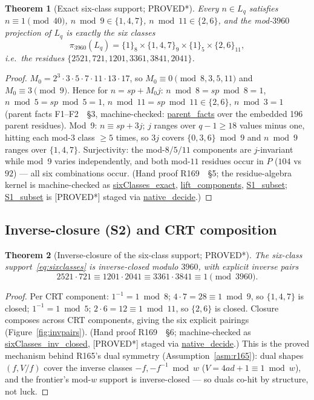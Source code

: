 \documentclass[11pt,a4paper]{article}
\newtheorem{theorem}{Theorem}
\theoremstyle{definition}
\begin{document}
\begin{theorem}[Exact six-class support; PROVED*]
  \label{thm:s1}
  Every $n\in L_q$ satisfies $n\equiv1\pmod{40}$, $n\bmod9\in\{1,4,7\}$,
  $n\bmod11\in\{2,6\}$, and the mod-$3960$ projection of $L_q$ is
  \emph{exactly} the six classes
  \begin{equation}
    \label{eq:sixclasses}
    \pi_{3960}(L_q)=\{1\}_8\times\{1,4,7\}_9\times\{1\}_5\times\{2,6\}_{11},
  \end{equation}
  i.e.\ the residues
  $\{2521,721,1201,3361,3841,2041\}$.
\end{theorem}
\begin{proof}
$M_0=2^3\cdot3\cdot5\cdot7\cdot11\cdot13\cdot17$, so
$M_0\equiv0\pmod{8,3,5,11}$ and $M_0\equiv3\pmod9$. Hence for
$n=sp+M_0j$: $n\bmod8=sp\bmod8=1$,
$n\bmod5=sp\bmod5=1$, $n\bmod11=sp\bmod11\in\{2,6\}$,
$n\bmod3=1$ (parent facts F1--F2~\cite{R169}~\S3, machine-checked:
\url{parent_facts} over the embedded 196 parent residues).
Mod~9: $n\equiv sp+3j$; $j$ ranges over $q-1\ge18$ values minus one,
hitting each mod-$3$ class $\ge5$ times, so $3j$ covers $\{0,3,6\}\bmod9$
and $n\bmod9$ ranges over $\{1,4,7\}$. Surjectivity: the
mod-$8/5/11$ components are $j$-invariant while mod~9 varies
independently, and both mod-$11$ residues occur in $P$ ($104$ vs $92$)
--- all six combinations occur. (Hand proof R169~\cite{R169}~\S5;
the residue-algebra kernel is machine-checked as
\url{sixClasses_exact}, \url{lift_components},
\url{S1_subset}; \url{S1_subset} is [PROVED*] staged
via \url{native_decide}.)
\end{proof}

\subsection{Inverse-closure (S2) and CRT composition}

\begin{theorem}[Inverse-closure of the six-class support; PROVED*]
  \label{thm:s2}
  The six-class support~\eqref{eq:sixclasses} is inverse-closed
  modulo $3960$, with explicit inverse pairs
  \begin{equation}
    \label{eq:invpairs}
    2521\cdot721\equiv1201\cdot2041\equiv3361\cdot3841\equiv1\pmod{3960}.
  \end{equation}
\end{theorem}
\begin{proof}
Per CRT component: $1^{-1}=1\bmod8$; $4\cdot7=28\equiv1\bmod9$, so
$\{1,4,7\}$ is closed; $1^{-1}=1\bmod5$; $2\cdot6=12\equiv1\bmod11$, so
$\{2,6\}$ is closed. Closure composes across CRT components, giving the
six explicit pairings (Figure~\ref{fig:invpairs}). (Hand proof
R169~\cite{R169}~\S6; machine-checked as
\url{sixClasses_inv_closed}, [PROVED*] staged via
\url{native_decide}.) This is the proved mechanism behind R165's
dual symmetry (Assumption~\ref{asm:r165}): dual shapes $(f,V/f)$ cover
the inverse classes $-f,-f^{-1}\bmod w$ ($V=4ad+1\equiv1\bmod w$), and
the frontier's mod-$w$ support is inverse-closed --- so duals co-hit by
structure, not luck.
\end{proof}
\end{document}
